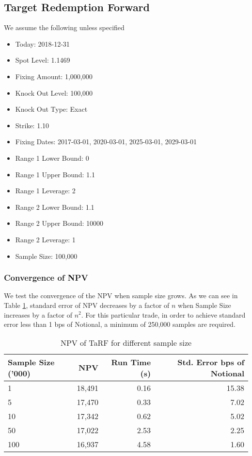 \subsection{Target Redemption Forward}

We assume the following unless specified

\begin{itemize}
\item Today: 2018-12-31
\item Spot Level: 1.1469
\item Fixing Amount: 1,000,000
\item Knock Out Level: 100,000
\item Knock Out Type: Exact
\item Strike: 1.10
\item Fixing Dates: 2017-03-01, 2020-03-01, 2025-03-01, 2029-03-01
\item Range 1 Lower Bound: 0
\item Range 1 Upper Bound: 1.1
\item Range 1 Leverage: 2
\item Range 2 Lower Bound: 1.1
\item Range 2 Upper Bound: 10000
\item Range 2 Leverage: 1
\item Sample Size: 100,000
\end{itemize}


\subsubsection{Convergence of NPV}
We test the convergence of the NPV when sample size grows. As we can see in Table \ref{tarf_npv_sample_convergence},
standard error of NPV decreases by a factor of $n$ when Sample Size increases by a factor of $n^2$. For this particular trade,
in order to achieve standard error less than 1 bps of Notional, a minimum of 250,000 samples are required.

\begin{table}[!htbp]
  \centering
  \begin{tabular}{l | r | r | r}
    Sample Size ('000) & NPV & Run Time (s) & Std. Error bps of Notional \\ \hline
    1 & 18,491 & 0.16 & 15.38 \\
    5 & 17,470 & 0.33 & 7.02 \\
    10 & 17,342 & 0.62 & 5.02 \\
    50 & 17,022 & 2.53 & 2.25 \\
    100 & 16,937 & 4.58 & 1.60 \\
  \end{tabular}
  \caption{NPV of TaRF for different sample size}
  \label{tarf_npv_sample_convergence}
\end{table}

